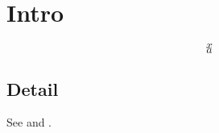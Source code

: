 \documentclass{wrapper}
\begin{document}
\wrapperclass\articleclass\layoutmode\hypermode
\section{Intro}\label{sec:intro}
\begin{equation}x\end{equation}
\begin{equation}\label{eq:first}a\end{equation}
\subsection{Detail}\label{sub:detail}
See  and .
\end{document}
